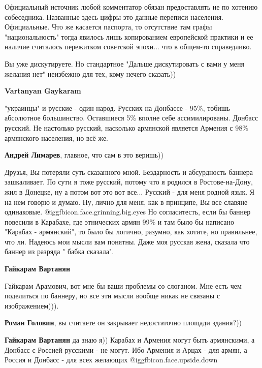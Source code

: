 \begin{itemize}
\begin{itemize}
Официальный источник любой комментатор обязан предоставлять не по хотению
собеседника. Названные здесь цифры это данные переписи населения. Официальные.
Что же касается паспорта, то отсутствие там графы "национальность" тогда
явилось лишь копированием европейской практики и ее наличие считалось
пережитком советской эпохи... что в общем-то справедливо.

Вы уже дискутируете. Но стандартное "Дальше дискутировать с вами у меня желания
нет" неизбежно для тех, кому нечего сказать))


\textbf{Vartanyan Gaykaram} 

"украинцы" и русские - один народ. Русских на Донбассе - 95\%, тобишь абсолютное
большинство. Оставшиеся 5\% вполне себе ассимилированы. Донбасс русский. Не
настолько русский, насколько армянской является Армения с 98\% армянского
населения, но всё же.


\textbf{Андрей Лимарев}, главное, что сам в это веришь))


Друзья, Вы потеряли суть сказанного мной. Бездарность и абсурдность баннера
зашкаливает. По сути я тоже русский, потому что я родился в Ростове-на-Дону,
жил в Донецке, ну а потом вот это вот все... Русский - для меня родной язык. Я
на нем говорю и думаю. Ну, лично для меня, как в принципе, Вы все славяне
одинаковые.  @igg{fbicon.face.grinning.big.eyes}  Но согласитесть, если бы баннер повесили в Карабахе, где
этнических армян 99\% и там было бы написано "Карабах - армянский", то было бы
логично, разумно, как хотите, но правильнее, что ли. Надеюсь мои мысли вам
понятны. Даже моя русская жена, сказала что баннер из разряда " бабка сказала".


\textbf{Гайкарам Вартанян} 

Гайкарам Арамович, вот мне бы ваши проблемы со слоганом. Мне есть чем
поделиться по баннеру, но все эти мысли вообще никак не связаны с
изображением))).

\textbf{Роман Головин}, вы считаете он закрывает недостаточно площади здания?))

\textbf{Гайкарам Вартанян} да знаю я)) Карабах и Армения могут быть армянскими, а Донбасс с Россией русскими - не могут. Ибо Армения и Арцах - для армян, а Россия и Донбасс - для всех желающих  @igg{fbicon.face.upside.down} 


\end{itemize}
\end{itemize}
